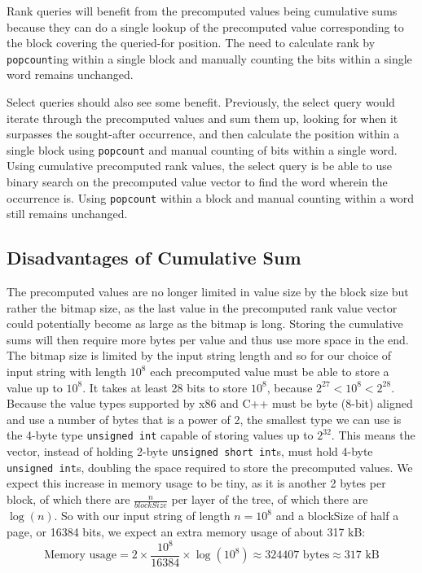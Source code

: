 Rank queries will benefit from the precomputed values being cumulative sums because they can do a single lookup of the precomputed value corresponding to the block covering the queried-for position.
The need to calculate rank by \texttt{popcount}ing within a single block and manually counting the bits within a single word remains unchanged.

Select queries should also see some benefit.
Previously, the select query would iterate through the precomputed values and sum them up, looking for when it surpasses the sought-after occurrence, and then calculate the position within a single block using \texttt{popcount} and manual counting of bits within a single word.
Using cumulative precomputed rank values, the select query is be able to use binary search on the precomputed value vector to find the word wherein the occurrence is.
Using \texttt{popcount} within a block and manual counting within a word still remains unchanged.

\subsection{Disadvantages of Cumulative Sum}
The precomputed values are no longer limited in value size by the block size but rather the bitmap size, as the last value in the precomputed rank value vector could potentially become as large as the bitmap is long.
Storing the cumulative sums will then require more bytes per value and thus use more space in the end.
The bitmap size is limited by the input string length and so for our choice of input string with length $10^8$ each precomputed value must be able to store a value up to $10^8$.
It takes at least 28 bits to store $10^8$, because $2^{27} < 10^8 < 2^{28}$.
Because the value types supported by x86 and C++ must be byte (8-bit) aligned and use a number of bytes that is a power of 2, the smallest type we can use is the 4-byte type \texttt{unsigned int} capable of storing values up to $2^{32}$.
This means the vector, instead of holding 2-byte \texttt{unsigned short int}s, must hold 4-byte \texttt{unsigned int}s, doubling the space required to store the precomputed values.
We expect this increase in memory usage to be tiny, as it is another 2 bytes per block, of which there are $\frac{n}{blockSize}$ per layer of the tree, of which there are $\log(n)$.
So with our input string of length $n = 10^8$ and a blockSize of half a page, or 16384 bits, we expect an extra memory usage of about 317 kB:
\[\text{Memory usage} = 2 \times \frac{10^8}{16384} \times \log(10^8) \approx 324407 \text{ bytes} \approx 317 \text{ kB} \]


